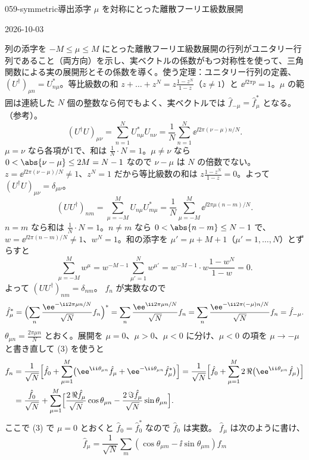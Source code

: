 \documentclass[uplatex,dvipdfmx,a4paper,11pt]{jsarticle}
\begin{document}
\begin{mondai}{059-symmetric}{導出}{添字 $\mu$ を対称にとった離散フーリエ級数展開}
\begin{maekizuki}{2026-10-03}
\end{maekizuki}
\begin{tadashii}
\houshin 列の添字を $-M\le\mu\le M$ にとった離散フーリエ級数展開の行列がユニタリー行列であること（両方向）を示し、実ベクトルの係数がもつ対称性を使って、三角関数による実の展開形とその係数を導く。使う定理：ユニタリー行列の定義、$(U^{\dagger})_{\mu n}=U_{n\mu}^{*}$。等比級数の和 $z+\dots+z^{N}=z\frac{1-z^{N}}{1-z}$（$z\neq1$）と $\ee^{\ii2\pi p}=1$。$\mu$ の範囲は連続した $N$ 個の整数なら何でもよく、実ベクトルでは $\hat{f}_{-\mu}=\hat{f}_{\mu}^{*}$ となる。（参考）。 %
\keisan
{}
\[
(U^{\dagger}U)_{\mu\nu}=\sum_{n=1}^{N}U_{n\mu}^{*}U_{n\nu}=\frac{1}{N}\sum_{n=1}^{N}\ee^{\ii 2\pi(\nu-\mu)n/N}.
\]
$\mu=\nu$ なら各項が1で、和は $\frac{1}{N}\cdot N=1$。$\mu\neq\nu$ なら $0<\abs{\nu-\mu}\le 2M=N-1$ なので $\nu-\mu$ は $N$ の倍数でない。$z=\ee^{\ii2\pi(\nu-\mu)/N}\neq1$、$z^{N}=1$ だから等比級数の和は $z\frac{1-z^{N}}{1-z}=0$。よって $(U^{\dagger}U)_{\mu\nu}=\delta_{\mu\nu}$。
\[
(UU^{\dagger})_{nm}=\sum_{\mu=-M}^{M}U_{n\mu}U_{m\mu}^{*}=\frac{1}{N}\sum_{\mu=-M}^{M}\ee^{\ii 2\pi\mu(n-m)/N}.
\]
$n=m$ なら和は $\frac{1}{N}\cdot N=1$。$n\neq m$ なら $0<\abs{n-m}\le N-1$ で、$w=\ee^{\ii2\pi(n-m)/N}\neq1$、$w^{N}=1$。和の添字を $\mu'=\mu+M+1$（$\mu'=1,\dots,N$）とずらすと
\[
\sum_{\mu=-M}^{M}w^{\mu}=w^{-M-1}\sum_{\mu'=1}^{N}w^{\mu'}=w^{-M-1}\cdot w\frac{1-w^{N}}{1-w}=0 .
\]
よって $(UU^{\dagger})_{nm}=\delta_{nm}$。
 $f_n$ が実数なので
\[
\hat{f}_{\mu}^{*}=\Bigl(\sum_n\frac{\ee^{-\ii2\pi\mu n/N}}{\sqrt{N}}f_n\Bigr)^{*}=\sum_n\frac{\ee^{\ii2\pi\mu n/N}}{\sqrt{N}}f_n=\sum_n\frac{\ee^{-\ii2\pi(-\mu)n/N}}{\sqrt{N}}f_n=\hat{f}_{-\mu}.
\]
 $\theta_{\mu n}=\frac{2\pi\mu n}{N}$ とおく。展開を $\mu=0$、$\mu>0$、$\mu<0$ に分け、$\mu<0$ の項を $\mu\to-\mu$ と書き直して (3) を使うと
\begin{align*}
f_n&=\frac{1}{\sqrt{N}}\Bigl[\hat{f}_0+\sum_{\mu=1}^{M}\bigl(\ee^{\ii\theta_{\mu n}}\hat{f}_{\mu}+\ee^{-\ii\theta_{\mu n}}\hat{f}_{\mu}^{*}\bigr)\Bigr]
=\frac{1}{\sqrt{N}}\Bigl[\hat{f}_0+\sum_{\mu=1}^{M}2\,\Re\bigl(\ee^{\ii\theta_{\mu n}}\hat{f}_{\mu}\bigr)\Bigr]\\
&=\frac{\hat{f}_0}{\sqrt{N}}+\sum_{\mu=1}^{M}\Bigl[\frac{2\,\Re\hat{f}_{\mu}}{\sqrt{N}}\cos\theta_{\mu n}-\frac{2\,\Im\hat{f}_{\mu}}{\sqrt{N}}\sin\theta_{\mu n}\Bigr].
\end{align*}
ここで (3) で $\mu=0$ とおくと $\hat{f}_0=\hat{f}_0^{*}$ なので $\hat{f}_0$ は実数。
$\hat{f}_{\mu}$ は次のように書け、
\[
\hat{f}_{\mu}=\frac{1}{\sqrt{N}}\sum_m(\cos\theta_{\mu m}-\ii\sin\theta_{\mu m})f_m
\]
\end{tadashii}
\end{mondai}
\end{document}
